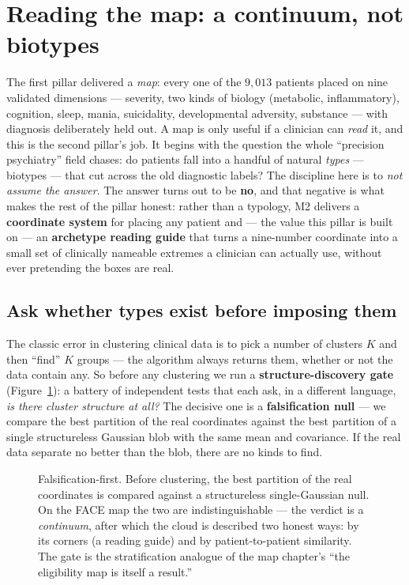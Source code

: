\section{Reading the map: a continuum, not biotypes}
\label{sec:strata}

The first pillar delivered a \emph{map}: every one of the $9{,}013$ patients placed on nine validated
dimensions --- severity, two kinds of biology (metabolic, inflammatory), cognition, sleep, mania, suicidality,
developmental adversity, substance --- with diagnosis deliberately held out. A map is only useful if a clinician
can \emph{read} it, and this is the second pillar's job. It begins with the question the whole ``precision
psychiatry'' field chases: do patients fall into a handful of natural \emph{types} --- biotypes --- that cut
across the old diagnostic labels? The discipline here is to \emph{not assume the answer}. The answer turns out
to be \textbf{no}, and that negative is what makes the rest of the pillar honest: rather than a typology, M2
delivers a \textbf{coordinate system} for placing any patient and --- the value this pillar is built on --- an
\textbf{archetype reading guide} that turns a nine-number coordinate into a small set of clinically nameable
extremes a clinician can actually use, without ever pretending the boxes are real.

\subsection{Ask whether types exist before imposing them}
\label{sub:continuum}
The classic error in clustering clinical data is to pick a number of clusters $K$ and then ``find'' $K$ groups
--- the algorithm always returns them, whether or not the data contain any. So before any clustering we run a
\textbf{structure-discovery gate} (Figure~\ref{fig:gateflow}): a battery of independent tests that each ask, in
a different language, \emph{is there cluster structure at all?} The decisive one is a \textbf{falsification
null} --- we compare the best partition of the real coordinates against the best partition of a single
structureless Gaussian blob with the same mean and covariance. If the real data separate no better than the
blob, there are no kinds to find.

\begin{figure}[h]\centering
\structuregateflow
\caption{Falsification-first. Before clustering, the best partition of the real coordinates is compared against a
structureless single-Gaussian null. On the FACE map the two are indistinguishable --- the verdict is a
\emph{continuum}, after which the cloud is described two honest ways: by its corners (a reading guide) and by
patient-to-patient similarity. The gate is the stratification analogue of the map chapter's ``the eligibility
map is itself a result.''}
\label{fig:gateflow}
\end{figure}

